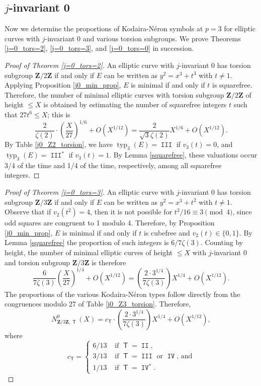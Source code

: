 \documentclass{amsart}
\newcommand{\Z}{\mathbf{Z}}
\newcommand{\T}{\operatorname{\mathsf{T}}}
\DeclareMathOperator{\typ}{{typ}}
\DeclareMathOperator{\II}{\mathtt{II}}
\DeclareMathOperator{\III}{\mathtt{III}}
\DeclareMathOperator{\IV}{\mathtt{IV}}
\numberwithin{equation}{section}
\theoremstyle{plain}
\theoremstyle{remark}
\begin{document}
\subsection{$j$-invariant 0} \label{j0-proportion-section}

Now we determine the proportions of Kodaira-N\'eron symbols at $p=3$ for elliptic curves with $j$-invariant 0 and various torsion subgroups.  We prove Theorems 
 \ref{j=0_tors=2}, \ref{j=0_tors=3}, and \ref{j=0_tors=0} in succession. 

\begin{proof}[Proof of Theorem \ref{j=0_tors=2}]
An elliptic curve with $j$-invariant 0 has torsion subgroup $\Z/2\Z$ if and only if $E$ can be written as $y^2 = x^3 + t^3$ with $t \ne 1$.  Applying Proposition \ref{j0_min_prop}, $E$ is minimal if and only if $t$ is squarefree. 
Therefore, the number of minimal elliptic curves with torsion subgroup $\Z/2\Z$ of height $\leq X$ is obtained by estimating the number of squarefree integers $t$ such that $27t^6 \leq X$; this is
\[
\frac{2}{\zeta(2)} \cdot \left(\frac{X}{27} \right)^{1/6} + O(X^{1/12})= \frac{2}{\sqrt{3}\zeta(2)} X^{1/6} + O(X^{1/12}).
\]
By Table \ref{j0_Z2_torsion}, we have $\typ_3(E) = \III$ if $v_3(t) = 0$, and $\typ_3(E) = \III^*$ if $v_3(t) = 1$.  By Lemma \ref{squarefree}, these valuations occur 3/4 of the time and 1/4 of the time, respectively, among all squarefree integers.  
\end{proof}

\begin{proof}[Proof of Theorem \ref{j=0_tors=3}]
An elliptic curve with $j$-invariant 0 has torsion subgroup $\Z/3\Z$ if and only if $E$ can be written as $y^2 = x^3 + t^2$ with $t \ne 1$. Observe that if $v_2(t^2) = 4$, then it is not possible for $t^2/16 \equiv 3 \pmod{4}$, since odd squares are congruent to 1 modulo 4.  Therefore, by Proposition \ref{j0_min_prop}, $E$ is minimal if and only if $t$ is cubefree and $v_2(t) \in \lbrace 0,1 \rbrace$.   By Lemma \ref{squarefree} the proportion of such integers is $6/7\zeta(3)$. Counting by height, the number of minimal elliptic curves of height $\leq X$ with $j$-invariant 0 and torsion subgroup $\Z/3\Z$ is therefore
\[
\frac{6}{7\zeta(3)} \left(\frac{X}{27}\right)^{1/4} + O(X^{1/12}) = \left( \frac{2\cdot3^{1/4}}{7\zeta(3)} \right) X^{1/4} + O(X^{1/12}).
\]
The proportions of the various Kodaira-N\'eron types follow directly from the congruences modulo 27 of Table \ref{j0_Z3_torsion}.  Therefore, 
\[
N_{\Z/3\Z,\T}^0(X) = c_{\T} \cdot \left( \frac{2\cdot3^{1/4}}{7\zeta(3)} \right) X^{1/4} + O(X^{1/12}),
\]
where 
\[
c_{\T} = 
\begin{cases} 
6/13 & \text{ if $\T = \II$}, \\
3/13 & \text{ if $\T = \III$ or $\IV$, and}  \\
1/13 & \text{ if $\T = \IV^*$.}
\end{cases}
\]
\end{proof}
\end{document}
